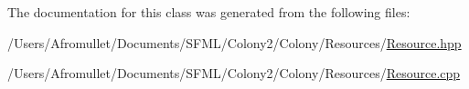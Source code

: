 The documentation for this class was generated from the following files\+:\begin{DoxyCompactItemize}
\item 
/\+Users/\+Afromullet/\+Documents/\+S\+F\+M\+L/\+Colony2/\+Colony/\+Resources/\mbox{\hyperlink{_resource_8hpp}{Resource.\+hpp}}\item 
/\+Users/\+Afromullet/\+Documents/\+S\+F\+M\+L/\+Colony2/\+Colony/\+Resources/\mbox{\hyperlink{_resource_8cpp}{Resource.\+cpp}}\end{DoxyCompactItemize}

